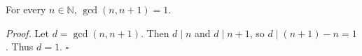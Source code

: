 For every $n \in \mathbb{N}$, $\gcd(n, n + 1) = 1$.

\textit{Proof.} Let $d = \gcd(n, n + 1)$.
Then $d \mid n$ and $d \mid n + 1$, so $d \mid (n + 1) - n = 1$.
Thus $d = 1$. \hfill$\square$